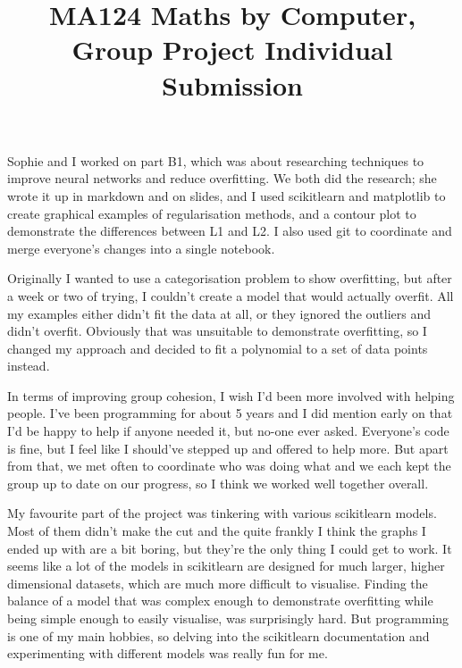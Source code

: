 \documentclass[a4paper]{article}
\title{MA124 Maths by Computer, Group Project Individual Submission}
\begin{document}
\maketitle

\setlength{\parindent}{0em}
\setlength{\parskip}{1em}


Sophie and I worked on part B1, which was about researching techniques to improve neural networks and reduce overfitting. We both did the research; she wrote it up in markdown and on slides, and I used scikitlearn and matplotlib to create graphical examples of regularisation methods, and a contour plot to demonstrate the differences between L1 and L2. I also used git to coordinate and merge everyone's changes into a single notebook.

Originally I wanted to use a categorisation problem to show overfitting, but after a week or two of trying, I couldn't create a model that would actually overfit. All my examples either didn't fit the data at all, or they ignored the outliers and didn't overfit. Obviously that was unsuitable to demonstrate overfitting, so I changed my approach and decided to fit a polynomial to a set of data points instead.

In terms of improving group cohesion, I wish I'd been more involved with helping people. I've been programming for about 5 years and I did mention early on that I'd be happy to help if anyone needed it, but no-one ever asked. Everyone's code is fine, but I feel like I should've stepped up and offered to help more. But apart from that, we met often to coordinate who was doing what and we each kept the group up to date on our progress, so I think we worked well together overall.

My favourite part of the project was tinkering with various scikitlearn models. Most of them didn't make the cut and the quite frankly I think the graphs I ended up with are a bit boring, but they're the only thing I could get to work. It seems like a lot of the models in scikitlearn are designed for much larger, higher dimensional datasets, which are much more difficult to visualise. Finding the balance of a model that was complex enough to demonstrate overfitting while being simple enough to easily visualise, was surprisingly hard. But programming is one of my main hobbies, so delving into the scikitlearn documentation and experimenting with different models was really fun for me.
\end{document}
